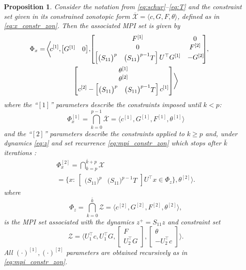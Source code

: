\documentclass[10pt,a4paper]{amsart}
\newtheorem{prop}{Proposition}
\newcommand{\bbm}{\begin{bmatrix}}
\newcommand{\ebm}{\end{bmatrix}}
\newcommand{\re}[1]{\mathbb{R}^{#1}}%
\begin{document}
\begin{prop}
\label{prop:cz}
    Consider the notation from \eqref{eq:schur}--\eqref{eq:T} and the constraint set given in its constrained zonotopic form $\overline{\mathcal X}=\langle c,G,F,\theta\rangle$, defined as in \eqref{eq:x_constr_zon}. Then the associated MPI set is given by 
    \begin{multline}
    \label{eq:mpi-schur-cz}
        \mkern-36mu\Phi_x = \mkern-2mu\biggl\langle \mkern-4mu c^{[1]},\mkern-2mu \bbm G^{[1]} & 0\ebm\mkern-2mu,\mkern-4mu \bbm F^{[1]} & 0\\ 0 & F^{[2]}\\ \bbm \bigl(S_{11}\bigr)^p &\bigl(S_{11}\bigr)^{p-1}T\ebm U^\top G^{[1]} & -G^{[2]}\mkern-4mu\ebm\mkern-4mu,\\
        \bbm \theta^{[1]}\\ \theta^{[2]}\\ c^{[2]}-\bbm \bigl(S_{11}\bigr)^p &\bigl(S_{11}\bigr)^{p-1}T\ebm c^{[1]}\ebm\biggr\rangle
    \end{multline}
    where the ``$[1]$'' parameters describe the constraints imposed until $k<p$:
    \begin{equation}
    \label{eq:omega_x_1_cz}
        \Phi_x^{[1]}=\bigcap\limits_{k=0}^{p-1} \overline{\mathcal X} = \bigl\langle c^{[1]}, G^{[1]}, F^{[1]}, \theta^{[1]}\bigr\rangle
    \end{equation}
and the ``$[2]$'' parameters describe the constraints applied to $k\geq p$ and, under dynamics \eqref{eq:z} and set recurrence \eqref{eq:mpi_constr_zon} which stops after $\bar k$ iterations \cite{10552328}:
    \begin{multline}
        \label{eq:omega_x_2_cz}
        \Phi_x^{[2]}=\bigcap\limits_{k=p}^{\bar k +p} {\mathcal X}\\
        =\{x:\: \bbm \bigl(S_{11}\bigr)^p &\bigl(S_{11}\bigr)^{p-1}T\ebm U^\top x\in \Phi_z\}, \theta^{[2]}\bigr\rangle.
    \end{multline}
    where
    \begin{equation}
        \label{eq:mpi_z_cz}
        \Phi_z =\bigcap\limits_{k=0}^{\bar k} {\mathcal Z}=\langle c^{[2]}, G^{[2]}, F^{[2]}, \theta^{[2]}\rangle,
    \end{equation}
    is the MPI set associated with the dynamics $z^+=S_{11}z$ and constraint set 
    \begin{equation}
    \label{eq:z-cz}
        \mathcal Z = \biggl\langle U_1^\top c, U_1^\top G, \bbm F\\ U_2^\top G\ebm, \bbm \theta\\ -U_2^\top c\ebm\biggr\rangle.
    \end{equation}
    All $(\cdot)^{[1]},(\cdot)^{[2]}$ parameters are obtained recursively as in \eqref{eq:mpi_constr_zon}.
\end{prop}
\end{document}
